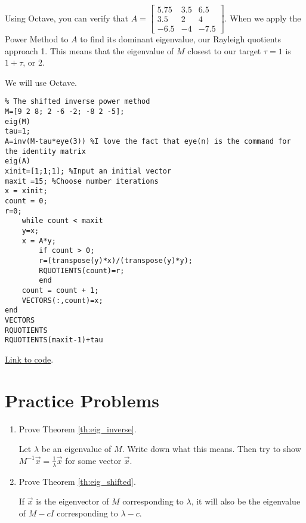 \documentclass{ximera}
\begin{document}
Using Octave, you can verify that $A=\left[ \begin{array}{rrr}
5.75 & 3.5 & 6.5 \\
3.5 & 2 & 4 \\
-6.5 & -4 & -7.5
\end{array}\right]$.  When we apply the Power Method to $A$ to find its dominant eigenvalue, our Rayleigh quotients approach 1.  This means that the eigenvalue of $M$ closest to our target $\tau = 1$ is $1+\tau$, or 2.

We will use Octave.

\begin{verbatim}
% The shifted inverse power method
M=[9 2 8; 2 -6 -2; -8 2 -5];
eig(M)
tau=1;
A=inv(M-tau*eye(3)) %I love the fact that eye(n) is the command for the identity matrix
eig(A)
xinit=[1;1;1]; %Input an initial vector
maxit =15; %Choose number iterations
x = xinit;
count = 0;
r=0;
    while count < maxit
    y=x;
    x = A*y;
        if count > 0; 
        r=(transpose(y)*x)/(transpose(y)*y);
        RQUOTIENTS(count)=r;
        end
    count = count + 1;
    VECTORS(:,count)=x;
end
VECTORS
RQUOTIENTS
RQUOTIENTS(maxit-1)+tau
\end{verbatim}

\href{https://sagecell.sagemath.org/?z=eJxVUcFuwjAMvVfqP_iC1MCqrUxMbF0mIcSBA0MDtgvikLXpGokmKHWh_fs5bSdYKiV-fvbzszqAXS6hzFWGMgWlz9KWEk7mIi0UEnOT-t6K759hDNOYrvAJwnEM4dTFk0Pse1L9BCvmeygqHhGecVIJViHhoWxk8MgYDJZwNGcJSLMykSAFAsGxmoEq23xiikLoFDJjW6xSqVFhA4VAq-pu0IwG1Uor5Psopu8Qk7Y-VQhCg8srcYSzTNBY3ytErRB4NKGieW4MLaar4ps2UyitQGV0SXLAoZUk74mpNHXAA8WWuxvoXHJ1dP4c9wqtakc0vO5LnMhs2PTIHZX1HW-kBte85QFaocsT2QkaNqzZ_f9Ew25UNh-f691y8b7bBq0a4_aGlTrtwJ_v7h1B1Bd9Lea79WYbvNz13c5v29UzvnedcBsH7ZZhxEb0G38BGwObqA==&lang=octave&interacts=eJyLjgUAARUAuQ==}{Link to code}.

\section*{Practice Problems}

\begin{problem}\label{prob:complete_eig_proofs}

\begin{enumerate}
    \item Prove Theorem \ref{th:eig_inverse}.
    \begin{hint}
    Let $\lambda$ be an eigenvalue of $M$.  Write down what this means.  Then try to show $M^{-1}\vec{x} = \frac{1}{\lambda}\vec{x}$ for some vector $\vec{x}$.
    \end{hint}
    
    \item Prove Theorem \ref{th:eig_shifted}.
    \begin{hint}
    If $\vec{x}$ is the eigenvector of $M$ corresponding to $\lambda$, it will also be the eigenvalue of $M-cI$ corresponding to $\lambda - c$. 
    \end{hint}
\end{enumerate}

\end{problem}
\end{document}
